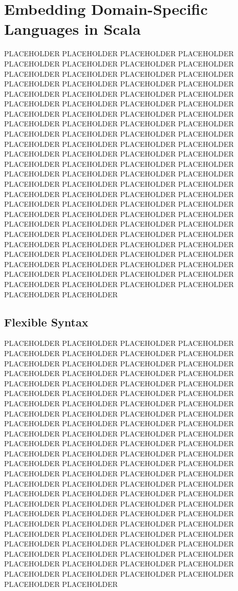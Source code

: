 \section{Embedding Domain-Specific Languages in Scala}

PLACEHOLDER PLACEHOLDER PLACEHOLDER PLACEHOLDER PLACEHOLDER PLACEHOLDER PLACEHOLDER PLACEHOLDER PLACEHOLDER PLACEHOLDER PLACEHOLDER PLACEHOLDER PLACEHOLDER PLACEHOLDER PLACEHOLDER PLACEHOLDER PLACEHOLDER PLACEHOLDER PLACEHOLDER PLACEHOLDER PLACEHOLDER PLACEHOLDER PLACEHOLDER PLACEHOLDER PLACEHOLDER PLACEHOLDER PLACEHOLDER PLACEHOLDER PLACEHOLDER PLACEHOLDER PLACEHOLDER PLACEHOLDER PLACEHOLDER PLACEHOLDER PLACEHOLDER PLACEHOLDER PLACEHOLDER PLACEHOLDER PLACEHOLDER PLACEHOLDER PLACEHOLDER PLACEHOLDER PLACEHOLDER PLACEHOLDER PLACEHOLDER PLACEHOLDER PLACEHOLDER PLACEHOLDER PLACEHOLDER PLACEHOLDER PLACEHOLDER PLACEHOLDER PLACEHOLDER PLACEHOLDER PLACEHOLDER PLACEHOLDER PLACEHOLDER PLACEHOLDER PLACEHOLDER PLACEHOLDER PLACEHOLDER PLACEHOLDER PLACEHOLDER PLACEHOLDER PLACEHOLDER PLACEHOLDER PLACEHOLDER PLACEHOLDER PLACEHOLDER PLACEHOLDER PLACEHOLDER PLACEHOLDER PLACEHOLDER PLACEHOLDER PLACEHOLDER PLACEHOLDER PLACEHOLDER PLACEHOLDER PLACEHOLDER PLACEHOLDER PLACEHOLDER PLACEHOLDER PLACEHOLDER PLACEHOLDER PLACEHOLDER PLACEHOLDER PLACEHOLDER PLACEHOLDER PLACEHOLDER PLACEHOLDER PLACEHOLDER PLACEHOLDER PLACEHOLDER PLACEHOLDER PLACEHOLDER PLACEHOLDER PLACEHOLDER PLACEHOLDER


\subsection{Flexible Syntax}

PLACEHOLDER PLACEHOLDER PLACEHOLDER PLACEHOLDER PLACEHOLDER PLACEHOLDER PLACEHOLDER PLACEHOLDER PLACEHOLDER PLACEHOLDER PLACEHOLDER PLACEHOLDER PLACEHOLDER PLACEHOLDER PLACEHOLDER PLACEHOLDER PLACEHOLDER PLACEHOLDER PLACEHOLDER PLACEHOLDER PLACEHOLDER PLACEHOLDER PLACEHOLDER PLACEHOLDER PLACEHOLDER PLACEHOLDER PLACEHOLDER PLACEHOLDER PLACEHOLDER PLACEHOLDER PLACEHOLDER PLACEHOLDER PLACEHOLDER PLACEHOLDER PLACEHOLDER PLACEHOLDER PLACEHOLDER PLACEHOLDER PLACEHOLDER PLACEHOLDER PLACEHOLDER PLACEHOLDER PLACEHOLDER PLACEHOLDER PLACEHOLDER PLACEHOLDER PLACEHOLDER PLACEHOLDER PLACEHOLDER PLACEHOLDER PLACEHOLDER PLACEHOLDER PLACEHOLDER PLACEHOLDER PLACEHOLDER PLACEHOLDER PLACEHOLDER PLACEHOLDER PLACEHOLDER PLACEHOLDER PLACEHOLDER PLACEHOLDER PLACEHOLDER PLACEHOLDER PLACEHOLDER PLACEHOLDER PLACEHOLDER PLACEHOLDER PLACEHOLDER PLACEHOLDER PLACEHOLDER PLACEHOLDER PLACEHOLDER PLACEHOLDER PLACEHOLDER PLACEHOLDER PLACEHOLDER PLACEHOLDER PLACEHOLDER PLACEHOLDER PLACEHOLDER PLACEHOLDER PLACEHOLDER PLACEHOLDER PLACEHOLDER PLACEHOLDER PLACEHOLDER PLACEHOLDER PLACEHOLDER PLACEHOLDER PLACEHOLDER PLACEHOLDER PLACEHOLDER PLACEHOLDER PLACEHOLDER PLACEHOLDER PLACEHOLDER PLACEHOLDER

